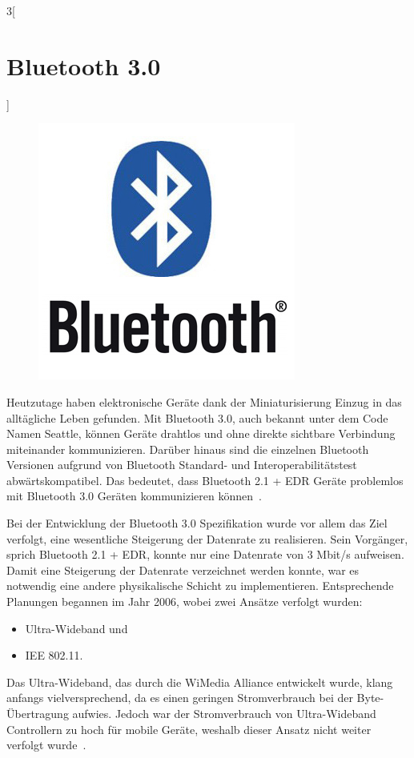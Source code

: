 \begin{multicols}{3}[\section{Bluetooth 3.0}]
\begin{figure}
  \vspace{-20pt}
  \begin{center}
  	\hspace{-20pt}
    \includegraphics[width=0.7\linewidth]{Kapitel/Bluetooth3.0/Grafiken/logo.jpg}
  \end{center}
  \vspace{-15pt}
\end{figure}

Heutzutage haben elektronische Geräte dank der Miniaturisierung Einzug in das alltägliche Leben gefunden. Mit Bluetooth 3.0, auch bekannt unter dem Code Namen Seattle, können Geräte drahtlos und ohne direkte sichtbare Verbindung miteinander kommunizieren. Darüber hinaus sind die einzelnen Bluetooth Versionen aufgrund von Bluetooth Standard- und Interoperabilitätstest abwärtskompatibel. Das bedeutet, dass Bluetooth 2.1 + EDR Geräte problemlos mit Bluetooth 3.0 Geräten kommunizieren können~\cite{bluetooth3.0.1}. 

Bei der Entwicklung der Bluetooth 3.0 Spezifikation wurde vor allem das Ziel verfolgt, eine wesentliche Steigerung der Datenrate zu realisieren. Sein Vorgänger, sprich Bluetooth 2.1 + EDR, konnte nur eine Datenrate von 3 Mbit/s aufweisen. Damit eine Steigerung der Datenrate verzeichnet werden konnte, war es notwendig eine andere physikalische Schicht zu implementieren. Entsprechende Planungen begannen im Jahr 2006, wobei zwei Ansätze verfolgt wurden: 
\begin{itemize}
	\item Ultra-Wideband  und
	\item IEE 802.11.
\end{itemize} 
Das Ultra-Wideband, das durch die WiMedia Alliance entwickelt wurde, klang anfangs vielversprechend, da es einen geringen Stromverbrauch bei der Byte-Übertragung aufwies. Jedoch war der Stromverbrauch von Ultra-Wideband Controllern zu hoch für mobile Geräte, weshalb dieser Ansatz nicht weiter verfolgt wurde~\cite{bluetooth3.0.2}. 


\end{multicols}
